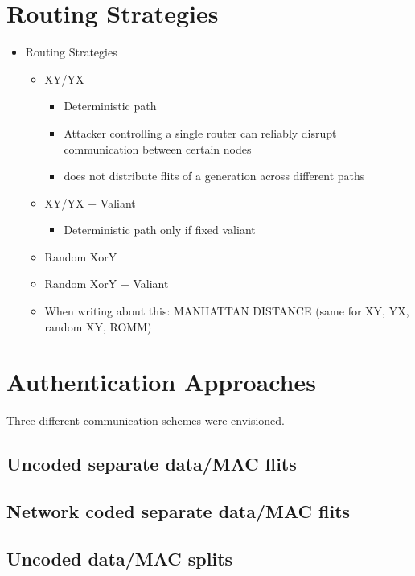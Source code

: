 \section{Routing Strategies}
\begin{itemize}
    \item Routing Strategies
        \begin{itemize}
            \item XY/YX
                \begin{itemize}
                    \item Deterministic path
                    \item Attacker controlling a single router can reliably disrupt communication between certain nodes
                    \item does not distribute flits of a generation across different paths
                \end{itemize}
            \item XY/YX + Valiant
                \begin{itemize}
                    \item Deterministic path only if fixed valiant
                \end{itemize}
            \item Random XorY
            \item Random XorY + Valiant
            \item When writing about this: MANHATTAN DISTANCE (same for XY, YX, random XY, ROMM)
        \end{itemize}
\end{itemize}

\section{Authentication Approaches}
Three different communication schemes were envisioned.

\subsection{Uncoded separate data/MAC flits}
\subsection{Network coded separate data/MAC flits}
\subsection{Uncoded data/MAC splits}
